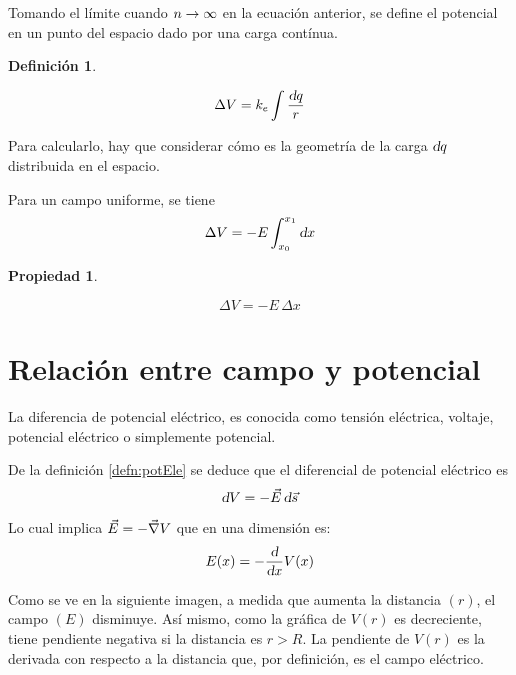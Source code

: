\documentclass[a5paper,12pt,twoside]{book}
\newtheorem{defn}{{Definición}}[chapter]
\newtheorem{prop}{{Propiedad}}[chapter]
\begin{document}
Tomando el límite cuando $n\to\infty$ en la ecuación anterior, se define el potencial en un punto del espacio dado por una carga contínua.

\begin{mdframed}[style=MyFrame1]
    \begin{defn}
    \end{defn}
    \begin{equation*}
        \Delta V = k_e \int \frac{\textsl{d} q}{r}
    \end{equation*}
\end{mdframed}

Para calcularlo, hay que considerar cómo es la geometría de la carga $\textsl{d} q$ distribuida en el espacio.

Para un campo uniforme, se tiene
\begin{equation*}
    \Delta V = - E \int_{x_0}^{x_1} \textsl{d} x
\end{equation*}

\begin{mdframed}[style=MyFrame1]
    \begin{prop}
    \end{prop}
    \begin{equation*}
        \Delta V = - E \, \Delta x
    \end{equation*}
\end{mdframed}


\section{Relación entre campo y potencial}

La diferencia de potencial eléctrico, es conocida como tensión eléctrica, voltaje, potencial eléctrico o simplemente potencial.

De la definición \ref{defn:potEle} se deduce que el diferencial de potencial eléctrico es
\begin{equation*}
    \textsl{d} V = - \Vec{E} \, \textsl{d} \Vec{s}
\end{equation*}

Lo cual implica $\Vec{E} = - \Vec{\nabla} V$ que en una dimensión es:
\begin{equation*}
    E(x) = - \frac{\textsl{d}}{\textsl{d} x} V(x)
\end{equation*}

Como se ve en la siguiente imagen, a medida que aumenta la distancia $(r)$, el campo $(E)$ disminuye. Así mismo, como la gráfica de $V(r)$ es decreciente, tiene pendiente negativa si la distancia es $r>R$. La pendiente de $V(r)$ es la derivada con respecto a la distancia que, por definición, es el campo eléctrico.
\end{document}
